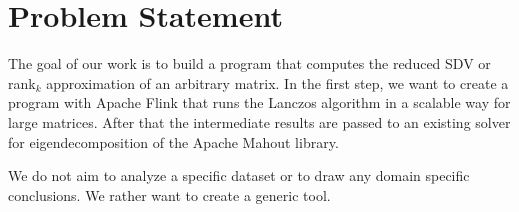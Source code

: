 \section{Problem Statement}

The goal of our work is to build a program that computes the reduced SDV or rank$_k$ approximation of an arbitrary matrix. In the first step, we want to create a program with Apache Flink that runs the Lanczos algorithm in a scalable way for large matrices. After that the intermediate results are passed to an existing solver for eigendecomposition of the Apache Mahout library.

We do not aim to analyze a specific dataset or to draw any domain specific conclusions. We rather want to create a generic tool.